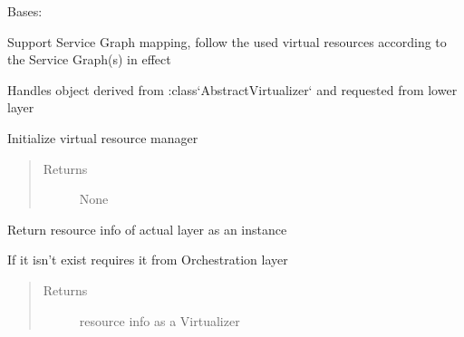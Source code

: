 \documentclass[letterpaper,10pt,english]{sphinxmanual}
\begin{document}
\begin{fulllineitems}
\label{service/sas_orchestration:escape.service.sas_orchestration.VirtualResourceManager}
Bases: 

Support Service Graph mapping, follow the used virtual resources according to
the Service Graph(s) in effect

Handles object derived from :class{}`AbstractVirtualizer{}` and requested from
lower layer

\begin{fulllineitems}
\label{service/sas_orchestration:escape.service.sas_orchestration.VirtualResourceManager._eventMixin_events}
\end{fulllineitems}


\begin{fulllineitems}
\label{service/sas_orchestration:escape.service.sas_orchestration.VirtualResourceManager.__init__}
Initialize virtual resource manager
\begin{quote}\begin{description}
\item[{Returns}] \leavevmode
None

\end{description}\end{quote}

\end{fulllineitems}


\begin{fulllineitems}
\label{service/sas_orchestration:escape.service.sas_orchestration.VirtualResourceManager.virtual_view}
Return resource info of actual layer as an {\hyperref[util/nffg:escape.util.nffg.NFFG]{\emph{}}} instance

If it isn't exist requires it from Orchestration layer
\begin{quote}\begin{description}
\item[{Returns}] \leavevmode
resource info as a Virtualizer


\end{description}
\end{quote}
\end{fulllineitems}
\end{fulllineitems}
\end{document}
